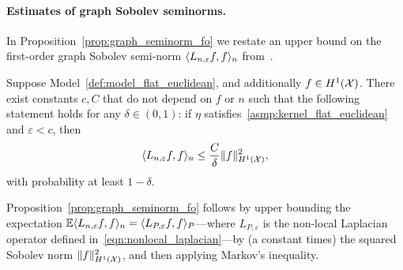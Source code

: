 \paragraph{Estimates of graph Sobolev seminorms.}
In Proposition~\ref{prop:graph_seminorm_fo} we restate an upper bound on the first-order graph Sobolev semi-norm $\langle L_{n,\varepsilon}f, f \rangle_n$ from~\cite{green2021}. 
\begin{proposition}
	\label{prop:graph_seminorm_fo}
	Suppose Model~\ref{def:model_flat_euclidean}, and additionally $f \in H^1(\mathcal{X})$. There exist constants $c,C$ that do not depend on $f$ or $n$ such that the following statement holds for any $\delta \in (0,1)$: if $\eta$ satisfies~\ref{asmp:kernel_flat_euclidean} and $\varepsilon < c$, then
	\begin{equation}
	\label{eqn:graph_seminorm_fo}
	\langle L_{n,\varepsilon}f, f \rangle_n \leq \frac{C}{\delta} \|f\|_{H^1(\mathcal{X})}^2,
	\end{equation}
	with probability at least $1 - \delta$.
\end{proposition}
Proposition~\ref{prop:graph_seminorm_fo} follows by upper bounding the expectation $\mathbb{E}\langle L_{n,\varepsilon}f, f \rangle_n = \langle L_{P,\varepsilon}f, f \rangle_P$---where $L_{P,\varepsilon}$ is the non-local Laplacian operator defined in~\eqref{eqn:nonlocal_laplacian}---by (a constant times) the squared Sobolev norm $\|f\|_{H^1(\mathcal{X})}^2$, and then applying Markov's inequality.


